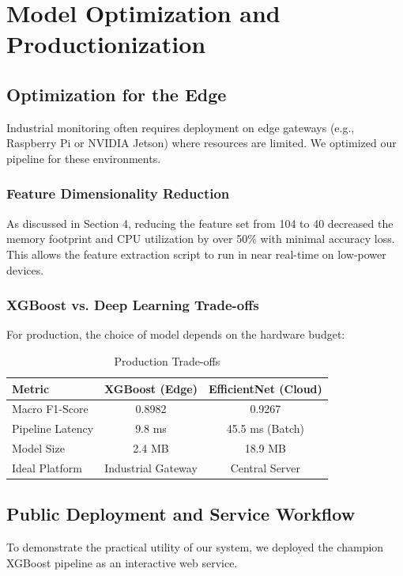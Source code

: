 \chapter{Model Optimization and Productionization}

\section{Optimization for the Edge}
Industrial monitoring often requires deployment on edge gateways (e.g., Raspberry Pi or NVIDIA Jetson) where resources are limited. We optimized our pipeline for these environments.

\subsection{Feature Dimensionality Reduction}
As discussed in Section 4, reducing the feature set from 104 to 40 decreased the memory footprint and CPU utilization by over 50\% with minimal accuracy loss. This allows the feature extraction script to run in near real-time on low-power devices.

\subsection{XGBoost vs. Deep Learning Trade-offs}
For production, the choice of model depends on the hardware budget:
\begin{table}[H]
    \centering
    \caption{Production Trade-offs}
    \begin{tabular}{@{}lcc@{}}
        \toprule
        \textbf{Metric} & \textbf{XGBoost (Edge)} & \textbf{EfficientNet (Cloud)} \\ \midrule
        Macro F1-Score & 0.8982 & 0.9267 \\
        Pipeline Latency & 9.8 ms & 45.5 ms (Batch) \\
        Model Size & 2.4 MB & 18.9 MB \\
        Ideal Platform & Industrial Gateway & Central Server \\ \bottomrule
    \end{tabular}
\end{table}

\section{Public Deployment and Service Workflow}
To demonstrate the practical utility of our system, we deployed the champion XGBoost pipeline as an interactive web service.


